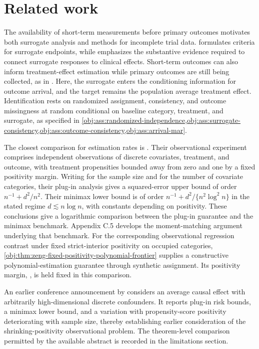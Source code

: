 \documentclass[11pt]{article}
\begin{document}
\section{Related work}

The availability of short-term measurements before primary outcomes motivates both surrogate analysis and methods for incomplete trial data. \citet{Prentice1989} formulates criteria for surrogate endpoints, while \citet{Fleming1996} emphasizes the substantive evidence required to connect surrogate responses to clinical effects. Short-term outcomes can also inform treatment-effect estimation while primary outcomes are still being collected, as in \citet{VanLancker2020}. Here, the surrogate enters the conditioning information for outcome arrival, and the target remains the population average treatment effect. Identification rests on randomized assignment, consistency, and outcome missingness at random conditional on baseline category, treatment, and surrogate, as specified in \cref{obj:ass:randomized-independence,obj:ass:surrogate-consistency,obj:ass:outcome-consistency,obj:ass:arrival-mar}.

The closest comparison for estimation rates is \citet[Assumption 2, Theorems 1--2, Section 3.2, and Appendix C.5]{ZengBalakrishnanHanKennedy2026}. Their observational experiment comprises independent observations of discrete covariates, treatment, and outcome, with treatment propensities bounded away from zero and one by a fixed positivity margin. Writing  for the sample size and  for the number of covariate categories, their plug-in analysis gives a squared-error upper bound of order \(n^{-1}+d^2/n^2\). Their minimax lower bound is of order \(n^{-1}+d^2/\{n^2\log^2 n\}\) in the stated regime \(d\lesssim n\log n\), with constants depending on positivity. These conclusions give a logarithmic comparison between the plug-in guarantee and the minimax benchmark. Appendix C.5 develops the moment-matching argument underlying that benchmark. For the corresponding observational regression contrast under fixed strict-interior positivity on occupied categories, \cref{obj:thm:zeng-fixed-positivity-polynomial-frontier} supplies a constructive polynomial-estimation guarantee through synthetic assignment. Its positivity margin, , is held fixed in this comparison.

An earlier conference announcement by \citet[abstract 300411]{Kennedy2019DiscreteAbstract} considers an average causal effect with arbitrarily high-dimensional discrete confounders. It reports plug-in risk bounds, a minimax lower bound, and a variation with propensity-score positivity deteriorating with sample size, thereby establishing earlier consideration of the shrinking-positivity observational problem. The theorem-level comparison permitted by the available abstract is recorded in the limitations section.
\end{document}
